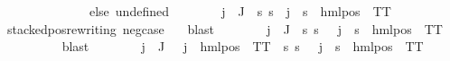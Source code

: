 \begin{isabellebody}
\ \ \ \ \ \ \ \ \ \ \ \ \ \ else\ undefined{\isacharparenright}{\kern0pt}{\isacharparenright}{\kern0pt}{\isachardoublequoteclose}\isanewline
\ \ \ \ \ \ \isamarkupfalse%
\ {\isachardoublequoteopen}{\isasymforall}j{\isasymin}{\isasymPhi}\ {\isacharbackquote}{\kern0pt}\ J{\isachardot}{\kern0pt}\ {\isacharparenleft}{\kern0pt}{\isasymexists}{\isasymalpha}{\isachardot}{\kern0pt}\ {\isacharparenleft}{\kern0pt}{\isasymforall}s{\isachardot}{\kern0pt}\ {\isacharparenleft}{\kern0pt}s\ {\isasymTurnstile}\ j{\isacharparenright}{\kern0pt}\ {\isasymlongleftrightarrow}\ {\isacharparenleft}{\kern0pt}s\ {\isasymTurnstile}\ {\isacharparenleft}{\kern0pt}hml{\isacharunderscore}{\kern0pt}pos\ {\isasymalpha}\ TT{\isacharparenright}{\kern0pt}{\isacharparenright}{\kern0pt}{\isacharparenright}{\kern0pt}{\isacharparenright}{\kern0pt}{\isachardoublequoteclose}\ \isanewline
\ \ \ \ \ \ \ \ \isamarkupfalse%
\ stacked{\isacharunderscore}{\kern0pt}pos{\isacharunderscore}{\kern0pt}rewriting\ neg{\isacharunderscore}{\kern0pt}case\ {}\ \isamarkupfalse%
\ blast\isanewline
\ \ \ \ \ \ \isamarkupfalse%
\ {\isachardoublequoteopen}{\isasymforall}j\ {\isasymin}\ J{\isachardot}{\kern0pt}\ {\isacharparenleft}{\kern0pt}{\isasymexists}{\isasymalpha}{\isachardot}{\kern0pt}\ {\isacharparenleft}{\kern0pt}{\isasymforall}s{\isachardot}{\kern0pt}\ {\isacharparenleft}{\kern0pt}s\ {\isasymTurnstile}\ {\isasymPhi}\ j{\isacharparenright}{\kern0pt}\ {\isasymlongleftrightarrow}\ {\isacharparenleft}{\kern0pt}s\ {\isasymTurnstile}\ {\isacharparenleft}{\kern0pt}hml{\isacharunderscore}{\kern0pt}pos\ {\isasymalpha}\ TT{\isacharparenright}{\kern0pt}{\isacharparenright}{\kern0pt}{\isacharparenright}{\kern0pt}{\isacharparenright}{\kern0pt}{\isachardoublequoteclose}\ \isanewline
\ \ \ \ \ \ \ \ \isamarkupfalse%
\ blast\isanewline
\ \ \ \ \ \ \isamarkupfalse%
\ {\isachardoublequoteopen}{\isasymforall}j\ {\isasymin}\ J{\isachardot}{\kern0pt}\ {\isasymexists}{\isasymalpha}\ {\isachardot}{\kern0pt}{\isasymPsi}\ j\ {\isacharequal}{\kern0pt}\ {\isacharparenleft}{\kern0pt}hml{\isacharunderscore}{\kern0pt}pos\ {\isasymalpha}\ TT{\isacharparenright}{\kern0pt}\ {\isasymand}\ {\isacharparenleft}{\kern0pt}{\isasymforall}s{\isachardot}{\kern0pt}\ {\isacharparenleft}{\kern0pt}s\ {\isasymTurnstile}\ {\isacharparenleft}{\kern0pt}{\isasymPhi}\ j{\isacharparenright}{\kern0pt}{\isacharparenright}{\kern0pt}\ {\isasymlongleftrightarrow}\ {\isacharparenleft}{\kern0pt}s\ {\isasymTurnstile}\ {\isacharparenleft}{\kern0pt}hml{\isacharunderscore}{\kern0pt}pos\ {\isasymalpha}\ TT{\isacharparenright}{\kern0pt}{\isacharparenright}{\kern0pt}{\isacharparenright}{\kern0pt}{\isachardoublequoteclose}\isanewline

\end{isabellebody}
